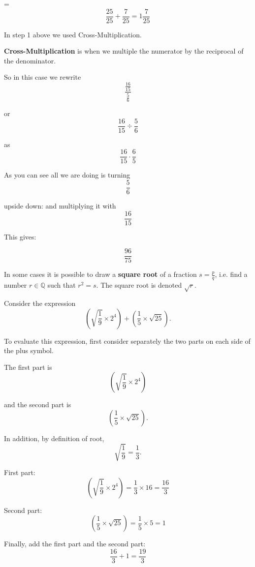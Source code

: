 \documentclass[12pt,a4paper]{article}
\theoremstyle{regla}
\theoremstyle{remark}
\theoremstyle{definition}
\theoremstyle{nonumberbreak}
\begin{document}
\begin{xmpl}
= $$\frac{25}{25}+\frac{7}{25} 
=1\frac{7}{25} $$

In step 1 above we used Cross-Multiplication. 

\begin{defn}
{\bf Cross-Multiplication} is when we multiple the numerator by the reciprocal of the denominator. 
\end{defn}
So in this case we rewrite
$$\frac{\frac{16}{15}}{\frac{5}{6}}$$

or $$\frac{16}{15} \div \frac{5}{6}$$

as $$\frac{16}{15} \cdot \frac{6}{5}$$

As you can see all we are doing is turning $$\frac{5}{6}$$

upside down: and multiplying it with $$\frac{16}{15}$$

This gives:

$$\frac{96}{75}$$

\end{xmpl}

In some cases it is possible to draw a \textbf{square root} of a fraction $s=\frac{p}{q}$, i.e. find a number $r\in \mathbb{Q}$ such that $r^2=s$. The square root is denoted $\sqrt{r}$.

\begin{xmpl}

Consider the expression $$\left(\sqrt{\frac{1}{9}} \times 2^4\right) + (\frac{1}{5} \times \sqrt{25}).$$

To evaluate this expression, first consider separately the two parts on each side of the plus symbol. 

The first part is $$\left(\sqrt{\frac{1}{9}} \times 2^4\right)$$

and the second part is $$(\frac{1}{5} \times \sqrt{25}).$$

 

In addition, by definition of root, $$\sqrt{\frac{1}{9}} = \frac{1}{3}.$$

 

First part: $$\left(\sqrt{\frac{1}{9}} \times 2^4\right) = \frac{1}{3} \times 16 = \frac{16}{3}$$

Second part: $$(\frac{1}{5} \times \sqrt{25}) = \frac{1}{5} \times 5 = 1$$

Finally, add the first part and the second part: $$\frac{16}{3} + 1 = \frac{19}{3}$$
\end{xmpl}
\end{document}
